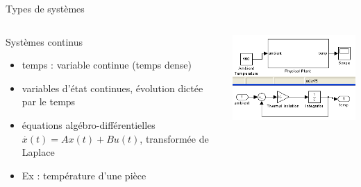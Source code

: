 \documentclass[compress]{beamer}
\begin{document}
\begin{frame}{Types de systèmes}
\begin{columns}
	\begin{block}{Systèmes continus}
	\begin{itemize}
	\item temps : variable continue (temps dense)
	\item variables d'état continues, évolution dictée par le temps
	\item équations algébro-différentielles $\overset{.}{x}(t)=Ax(t)+Bu(t)$, transformée de Laplace
	\item Ex : température d'une pièce
	\end{itemize}
	\end{block}
	\includegraphics[width=.9\linewidth]{plant_sans}
\end{columns}
\end{frame}
\end{document}
